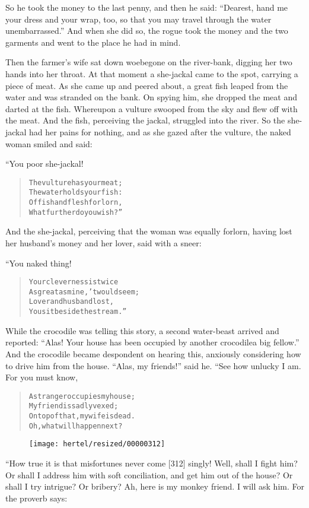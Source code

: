 \documentclass[article, twoside, 10pt]{memoir}
\renewenvironment{verbatim}{%
\begin{quote}%
\vskip -10pt%
\begin{alltt}\normalfont\small}{\end{alltt}%
\end{quote}%
\vskip -10pt
} %
\begin{document}
So he took the money to the last penny, and then he said:
``Dearest, hand me your dress and your wrap, too, so that you may travel through the water unembarrassed.''
And when she did so, the rogue took the money and the two garments
and went to the place he had in mind.

Then the farmer's wife sat down woebegone on the river-bank,
digging her two hands into her throat. At that moment a she-jackal
came to the spot, carrying a piece of meat. As she came up and
peered about, a great fish leaped from the water and was stranded
on the bank. On spying him, she dropped the meat and darted at the
fish. Whereupon a vulture swooped from the sky and flew off with
the meat. And the fish, perceiving the jackal, struggled into the
river. So the she-jackal had her pains for nothing, and as she
gazed after the vulture, the naked woman smiled and said:

“You poor she-jackal!

\begin{verbatim}
The vulture has your meat;
    The water holds your fish:
Of fish and flesh forlorn,
    What further do you wish?”
\end{verbatim}
And the she-jackal, perceiving that the woman was equally forlorn,
having lost her husband's money and her lover, said with a sneer:

“You naked thing!

\begin{verbatim}
Your cleverness is twice
    As great as mine, 'twould seem;
Lover and husband lost,
    You sit beside the stream.”
\end{verbatim}
While the crocodile was telling this story, a second water-beast
arrived and reported:
``Alas! Your house has been occupied by another crocodile{\textemdash}a big fellow.''
And the crocodile became despondent on hearing this, anxiously
considering how to drive him from the house. ``Alas, my friends!''
said he. “See how unlucky I am. For you must know,

\begin{verbatim}
A stranger occupies my house;
    My friend is sadly vexed;
On top of that, my wife is dead.
    Oh, what will happen next?
\end{verbatim}
\begin{figure}[p]\texttt{[image: hertel/resized/00000312]}\end{figure}“How true it is that misfortunes never come [312] singly! Well,
shall I fight him? Or shall I address him with soft conciliation,
and get him out of the house? Or shall I try intrigue? Or bribery?
Ah, here is my monkey friend. I will ask him. For the proverb
says:
\end{document}
